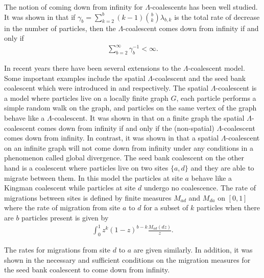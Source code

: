 \documentclass[11pt]{article}
\theoremstyle{definition}
\begin{document}
\noindent The notion of coming down from infinity for $\Lambda$-coalescents has been well studied. It was shown in \cite{lamdacomedown} that if $\gamma_b = \sum_{k = 2}^b (k-1)\binom{b}{k} \lambda_{b,k}$ is the total rate of decrease in the number of particles, then the $\Lambda$-coalescent comes down from infinity if and only if
%
\begin{align*}
    \sum_{b = 2}^\infty \gamma_b^{-1} < \infty.
\end{align*}
\medskip

\noindent In recent years there have been several extensions to the $\Lambda$-coalescent model. Some important examples include the spatial $\Lambda$-coalescent and the seed bank coalescent which were introduced in \cite{spatial} and \cite{seedbank2, seedbank1} respectively. The spatial $\Lambda$-coalescent is a model where particles live on a locally finite graph $G$, each particle performs a simple random walk on the graph, and particles on the same vertex of the graph behave like a $\Lambda$-coalescent. It was shown in \cite{spatial} that on a finite graph the spatial $\Lambda$-coalescent comes down from infinity if and only if the (non-spatial) $\Lambda$-coalescent comes down from infinity. In contrast, it was shown in \cite{Angel2012} that a spatial $\Lambda$-coalescent on an infinite graph will not come down from infinity under any conditions in a phenomenon called global divergence. The seed bank coalescent on the other hand is a coalescent where particles live on two sites $\{a,d\}$ and they are able to migrate between them. In this model the particles at site $a$ behave like a Kingman coalescent while particles at site $d$ undergo no coalescence. The rate of migrations between sites is defined by finite measures $M_{ad}$ and $M_{da}$ on $[0,1]$ where the rate of migration from site $a$ to $d$ for a subset of $k$ particles when there are $b$ particles present is given by
%
\begin{align*}
    \int_0^1 z^k(1-z)^{b-k} \frac{M_{ad}(dz)}{z}.
\end{align*}

\noindent The rates for migrations from site $d$ to $a$ are given similarly. In addition, it was shown in \cite{seedbank2} the necessary and sufficient conditions on the migration measures for the seed bank coalescent to come down from infinity. 
\medskip
\end{document}
